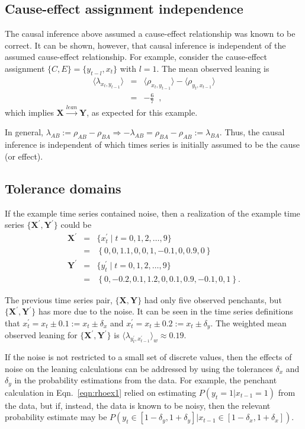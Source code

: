 \documentclass[twocolumn,aps,pre,groupedaddress]{revtex4-1}
\begin{document}
\subsection{Cause-effect assignment independence}
The causal inference above assumed a cause-effect relationship was known to be correct.  It can be shown, however, that causal inference is independent of the assumed cause-effect relationship.  For example, consider the cause-effect assignment $\{C,E\}=\{y_{t-l},x_t\}$ with $l=1$. The mean observed leaning is
\begin{eqnarray*}
\langle \lambda_{x_t,y_{t-1}} \rangle &=& \langle \rho_{x_t,y_{t-1}} \rangle - \langle \rho_{y_t,x_{t-1}} \rangle\\
&=& -\frac{6}{7}\;\;,
\end{eqnarray*}
which implies $\mathbf{X}\xrightarrow{lean}\mathbf{Y}$, as expected for this example.

In general, $\lambda_{AB} := \rho_{AB} - \rho_{BA}\Rightarrow -\lambda_{AB} = \rho_{BA} - \rho_{AB} := \lambda_{BA}$.  Thus, the causal inference is independent of which times series is initially assumed to be the cause (or effect).  

\subsection{Tolerance domains}
\label{sec:tol}
If the example time series contained noise, then a realization of the example time series $\{\mathbf{X}^\prime,\mathbf{Y}^\prime\}$ could be
\begin{eqnarray*}
\mathbf{X}^\prime &=& \{x_t^\prime\; | \; t=0,1,2,\ldots,9\}\\
&=& \left\{0,0,1.1,0,0,1,-0.1,0,0.9,0\right\}\\
\mathbf{Y}^\prime &=& \{y_t^\prime\; | \; t=0,1,2,\ldots,9\}\\
&=& \left\{0,-0.2,0.1,1.2,0,0.1,0.9,-0.1,0,1\right\}.
\end{eqnarray*}

The previous time series pair, $\{\mathbf{X},\mathbf{Y}\}$ had only five observed penchants, but $\{\mathbf{X}^\prime,\mathbf{Y}^\prime\}$ has more due to the noise.  It can be seen in the time series definitions that $x_t^\prime = x_t \pm 0.1 := x_t \pm \delta_x$ and $x_t^\prime = x_t \pm 0.2 := x_t \pm \delta_y$.  The weighted mean observed leaning for $\{\mathbf{X}^\prime,\mathbf{Y}^\prime\}$ is $\langle \lambda_{y_t^\prime,x_{t-1}^\prime} \rangle_w \approx 0.19$. 

If the noise is not restricted to a small set of discrete values, then the effects of noise on the leaning calculations can be addressed by using the tolerances $\delta_x$ and $\delta_y$ in the probability estimations from the data.  For example, the penchant calculation in Eqn.\ \ref{eqn:rhoex1} relied on estimating $P(y_t=1|x_{t-1}=1)$ from the data, but if, instead, the data is known to be noisy, then the relevant probability estimate may be $P(y_t\in[1-\delta_y,1+\delta_y]|x_{t-1}\in[1-\delta_x,1+\delta_x])$.  
\end{document}
